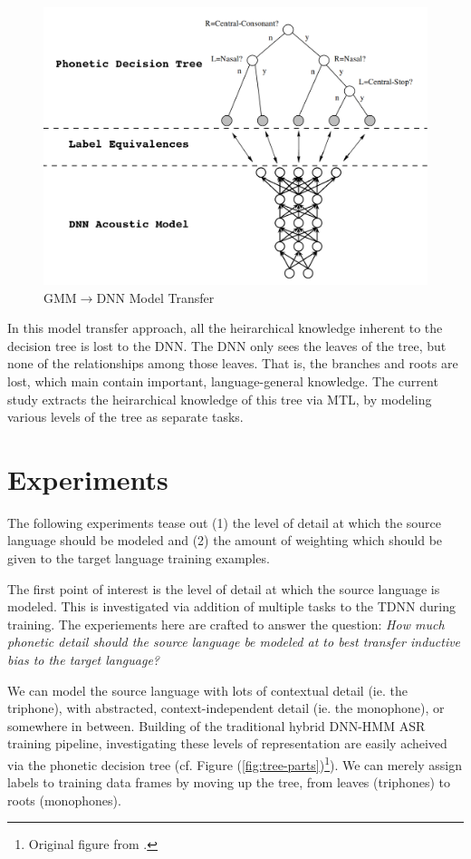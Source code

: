 \documentclass[a4paper]{article}
\begin{document}
\begin{figure}[!htbp]
  \centering
{}
  \includegraphics[width=\linewidth]{figs/tree-net.png}
  \caption{GMM$\rightarrow$DNN Model Transfer}
    \label{fig:tree-net}
  \endminipage\hfill
\end{figure}

In this model transfer approach, all the heirarchical knowledge inherent to the decision tree is lost to the DNN. The DNN only sees the leaves of the tree, but none of the relationships among those leaves. That is, the branches and roots are lost, which main contain important, language-general knowledge. The current study extracts the heirarchical knowledge of this tree via MTL, by modeling various levels of the tree as separate tasks. 


\section{Experiments}

The following experiments tease out (1) the level of detail at which the source language should be modeled and (2) the amount of weighting which should be given to the target language training examples.

The first point of interest is the level of detail at which the source language is modeled. This is investigated via addition of multiple tasks to the TDNN during training. The experiements here are crafted to answer the question: \textit{How much phonetic detail should the source language be modeled at to best transfer inductive bias to the target language?}

We can model the source language with lots of contextual detail (ie. the triphone), with abstracted, context-independent detail (ie. the monophone), or somewhere in between. Building of the traditional hybrid DNN-HMM ASR training pipeline, investigating these levels of representation are easily acheived via the phonetic decision tree (cf. Figure (\ref{fig:tree-parts})\footnote{Original figure from \cite{young2002}.}). We can merely assign labels to training data frames by moving up the tree, from leaves (triphones) to roots (monophones).
\end{document}
